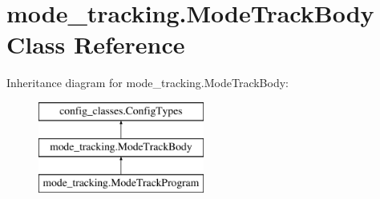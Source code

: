 \hypertarget{classmode__tracking_1_1_mode_track_body}{\section{mode\-\_\-tracking.\-Mode\-Track\-Body Class Reference}
\label{classmode__tracking_1_1_mode_track_body}
}
Inheritance diagram for mode\-\_\-tracking.\-Mode\-Track\-Body\-:\begin{figure}[H]
\begin{center}
\leavevmode
\includegraphics[height=3.000000cm]{classmode__tracking_1_1_mode_track_body}
\end{center}
\end{figure}
